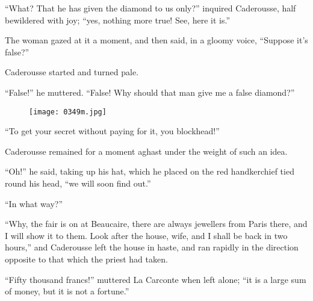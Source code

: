 “What? That he has given the diamond to us only?” inquired Caderousse,
half bewildered with joy; “yes, nothing more true! See, here it is.”

The woman gazed at it a moment, and then said, in a gloomy voice,
“Suppose it’s false?”

Caderousse started and turned pale.

“False!” he muttered. “False! Why should that man give me a false
diamond?”

\begin{figure}[ht]
\texttt{[image: 0349m.jpg]}
\end{figure}

“To get your secret without paying for it, you blockhead!”

Caderousse remained for a moment aghast under the weight of such an
idea.

“Oh!” he said, taking up his hat, which he placed on the red
handkerchief tied round his head, “we will soon find out.”

“In what way?”

“Why, the fair is on at Beaucaire, there are always jewellers from
Paris there, and I will show it to them. Look after the house, wife,
and I shall be back in two hours,” and Caderousse left the house in
haste, and ran rapidly in the direction opposite to that which the
priest had taken.

“Fifty thousand francs!” muttered La Carconte when left alone; “it is a
large sum of money, but it is not a fortune.”
